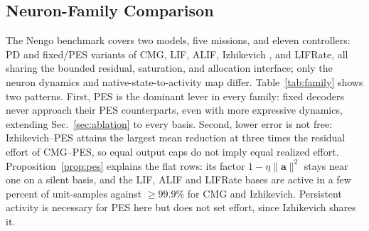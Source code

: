 \documentclass[letterpaper, 10 pt, conference]{ieeeconf}
\newcommand{\clip}{\operatorname{clip}}
\begin{document}
\subsection{Neuron-Family Comparison}
The Nengo benchmark covers two models, five missions, and eleven controllers: PD and fixed/PES variants of CMG, LIF, ALIF, Izhikevich \cite{izhikevich2003}, and LIFRate, all sharing the bounded residual, saturation, and allocation interface; only the neuron dynamics and native-state-to-activity map differ.
Table~\ref{tab:family} shows two patterns. First, PES is the dominant lever
in every family: fixed decoders never approach their PES counterparts, even
with more expressive dynamics, extending Sec.~\ref{sec:ablation} to every
basis. Second, lower error is not free: Izhikevich--PES attains the largest
mean reduction at three times the residual effort of CMG--PES, so equal
output caps do not imply equal realized effort.
Proposition~\ref{prop:pes} explains the flat rows: its factor
$1-\eta\|\bm a\|^2$ stays near one on a silent basis, and the LIF, ALIF and
LIFRate bases are active in a few percent of unit-samples against
${\ge}99.9\%$ for CMG and Izhikevich. Persistent activity is necessary for
PES here but does not set effort, since Izhikevich shares it.




\end{document}
